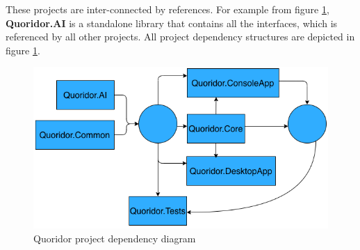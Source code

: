 These projects are inter-connected by references. For example from figure \ref{fig:proj_dep}, \textbf{Quoridor.AI} is a standalone library that contains all the interfaces, which is referenced by all other projects.
All project dependency structures are depicted in figure \ref{fig:proj_dep}.

\begin{figure}[!ht]
    \centering
    \includegraphics[width=.95\linewidth]{../img/project_structure.png}
    \caption{Quoridor project dependency diagram}
    \label{fig:proj_dep}
\end{figure}